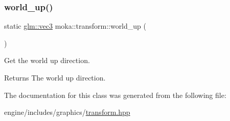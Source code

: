 \subsubsection{\texorpdfstring{world\_up()}{world\_up()}}
{\footnotesize\ttfamily static \mbox{\hyperlink{namespacemoka_aed2224bc0e5b79e57a8975ded94ee1aaa97ade28e93c0de60adc075bdbe07ca36}{glm\+::vec3}} moka\+::transform\+::world\+\_\+up (\begin{DoxyParamCaption}{ }\end{DoxyParamCaption})\hspace{0.3cm}{\ttfamily [static]}}



Get the world up direction. 

\begin{DoxyReturn}{Returns}
The world up direction. 
\end{DoxyReturn}


The documentation for this class was generated from the following file\+:\begin{DoxyCompactItemize}
\item 
engine/includes/graphics/\mbox{\hyperlink{transform_8hpp}{transform.\+hpp}}\end{DoxyCompactItemize}
